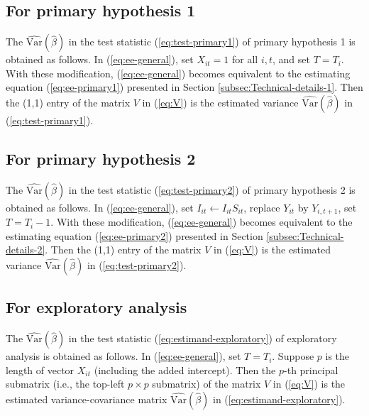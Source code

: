 \documentclass[11pt]{article}
\begin{document}
\subsection{For primary hypothesis 1}

The $\widehat{\text{Var}}(\hat{\beta})$ in the test statistic (\ref{eq:test-primary1})
of primary hypothesis 1 is obtained as follows. In (\ref{eq:ee-general}),
set $X_{it}=1$ for all $i,t$, and set $T=T_i$. With these modification,
(\ref{eq:ee-general}) becomes equivalent to the estimating equation
(\ref{eq:ee-primary1}) presented in Section \ref{subsec:Technical-details-1}.
Then the (1,1) entry of the matrix $V$ in (\ref{eq:V}) is the estimated
variance $\widehat{\text{Var}}(\hat{\beta})$ in (\ref{eq:test-primary1}).

\subsection{For primary hypothesis 2}

The $\widehat{\text{Var}}(\hat{\beta})$ in the test statistic (\ref{eq:test-primary2})
of primary hypothesis 2 is obtained as follows. In (\ref{eq:ee-general}),
set $I_{it} \leftarrow I_{it} S_{it}$, replace $Y_{it}$ by $Y_{i,t+1}$, set
$T= T_i - 1$. With these modification, (\ref{eq:ee-general}) becomes equivalent to the estimating equation (\ref{eq:ee-primary2})
presented in Section \ref{subsec:Technical-details-2}.
Then the (1,1) entry of the matrix $V$ in (\ref{eq:V}) is the estimated
variance $\widehat{\text{Var}}(\hat{\beta})$ in (\ref{eq:test-primary2}).

\subsection{For exploratory analysis}

The $\widehat{\text{Var}}(\hat{\beta})$ in the test statistic (\ref{eq:estimand-exploratory})
of exploratory analysis is obtained as follows. In (\ref{eq:ee-general}),
set $T=T_i$. Suppose $p$ is the length of vector $X_{it}$ (including
the added intercept). Then the $p$-th principal submatrix (i.e.,
the top-left $p\times p$ submatrix) of the matrix $V$ in (\ref{eq:V})
is the estimated variance-covariance matrix $\widehat{\text{Var}}(\hat{\beta})$
in (\ref{eq:estimand-exploratory}).
\end{document}
